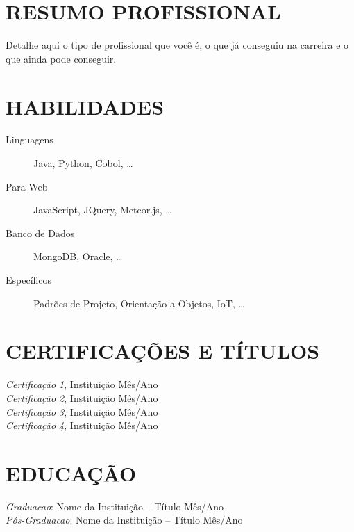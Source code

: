 \documentclass{res}
\begin{document}
\thispagestyle{empty} %
\address{{\bf Cidade} -- Bairro \\
  Tel. (61) 9999.9999 \\  Tel.Contato (61) 9999.9999}      
                                      
\begin{resume}
 
\section{RESUMO PROFISSIONAL}
\vspace{8pt}
Detalhe aqui o tipo de profissional que você é, o que já conseguiu na carreira 
e o que ainda pode conseguir. 
 
\section{HABILIDADES}
\vspace{18pt} 
\begin{description}
 \item[Linguagens] Java, Python, Cobol, \ldots
 \item[Para Web] JavaScript, JQuery, Meteor.js, \ldots 
 \item[Banco de Dados] MongoDB, Oracle, \ldots 
 \item[Específicos] Padrões de Projeto, Orientação a Objetos, IoT, \ldots 
\end{description}

\section{CERTIFICAÇÕES E TÍTULOS}
\vspace{8pt}
{\sl Certificação 1}, Instituição \hfill Mês/Ano \\
{\sl Certificação 2}, Instituição \hfill Mês/Ano \\
{\sl Certificação 3}, Instituição \hfill Mês/Ano \\
{\sl Certificação 4}, Instituição \hfill Mês/Ano

\section{EDUCAÇÃO}
\vspace{8pt} 
{\sl Graduacao}: Nome da Instituição -- Título     \hfill Mês/Ano \\
{\sl Pós-Graduacao}: Nome da Instituição -- Título \hfill Mês/Ano
  

\end{resume}
\end{document}
